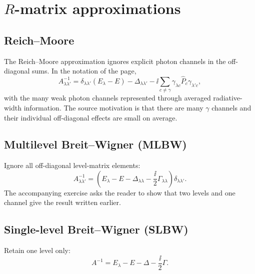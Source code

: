 \section{\texorpdfstring{$R$}{R}-matrix approximations}
\subsection*{Reich--Moore}
The Reich--Moore approximation ignores explicit photon channels in the off-diagonal sums.  In the notation of the page,
\begin{equation}
  A^{-1}_{\lambda\lambda'}
  =\delta_{\lambda\lambda'}(E_\lambda-E)
  -\Delta_{\lambda\lambda'}
  -\ii\sum_{c\ne\gamma}
  \gamma_{\lambda c}\widehat P_c\gamma_{\lambda'c},
  \label{eq:rmat-reich-moore}
\end{equation}
with the many weak photon channels represented through averaged radiative-width information.  The source motivation is that there are many $\gamma$ channels and their individual off-diagonal effects are small on average.

\subsection*{Multilevel Breit--Wigner (MLBW)}
Ignore all off-diagonal level-matrix elements:
\begin{equation}
  A^{-1}_{\lambda\lambda'}
  =\left(E_\lambda-E-\Delta_{\lambda\lambda}
  -\frac{\ii}{2}\Gamma_{\lambda\lambda}\right)
  \delta_{\lambda\lambda'}.
  \label{eq:rmat-mlbw}
\end{equation}
The accompanying exercise asks the reader to show that two levels and one channel give the result written earlier.

\subsection*{Single-level Breit--Wigner (SLBW)}
Retain one level only:
\begin{equation}
  A^{-1}=E_\lambda-E-\Delta-\frac{\ii}{2}\Gamma.
  \label{eq:rmat-slbw}
\end{equation}
